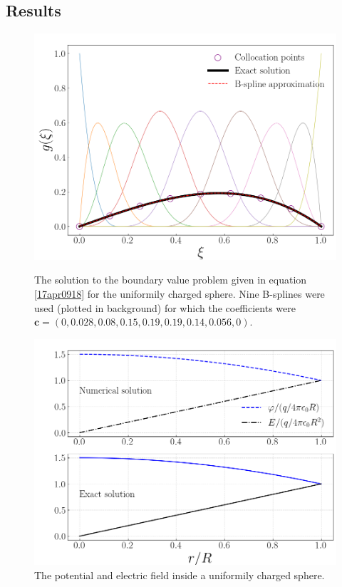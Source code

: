 \documentclass[twocolumn]{article}
\begin{document}
\begin{large}
\subsection*{Results}
\begin{figure}[b!]
    \includegraphics[scale=0.35]{Uniform_g.png}
    \caption{The solution to the boundary value problem given in equation \eqref{17apr0918} for the uniformily charged sphere. Nine B-splines were used (plotted in background) for which the coefficients were $\mathbf{c} = (0,0.028,0.08,0.15,0.19,0.19,0.14,0.056,0)$.}
    \label{17apr0917}
    \includegraphics[scale=0.35]{Uniform_EPhi.png}
    \caption{The potential and electric field inside a uniformily charged sphere.}
    \label{17apr0937}
\end{figure}

\end{large}
\end{document}
